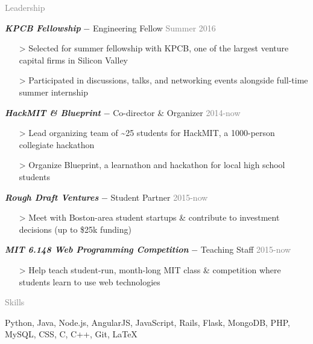 \documentclass[11pt]{article}
\newcommand{\rsection}[1]{\vspace{1.5em}\textcolor{gray}{\Large \robotoslab #1}\vspace{0.5em}}
\newcommand{\bt}[1]{\textit{\textbf{#1}}} %
\newcommand{\gap}[0]{\vspace{0.5em}} %
\newcommand{\dash}[0]{ $-$ } %
\newcommand{\gray}[1]{\textcolor{gray}{#1}}
\newcommand{\e}[0]{> }
\begin{document}
\rsection{Leadership}

\bt{KPCB Fellowship}\dash Engineering Fellow \hfill \gray{Summer 2016}

\begin{itemize}
\item[\e] Selected for summer fellowship with KPCB, one of the largest venture capital firms in Silicon Valley
\item[\e] Participated in discussions, talks, and networking events alongside full-time summer internship
\end{itemize}

\gap

\bt{HackMIT \& Blueprint}\dash Co-director \& Organizer \hfill \gray{2014-now}

\begin{itemize}
\item[\e] Lead organizing team of \textasciitilde 25 students for HackMIT, a 1000-person collegiate hackathon
\item[\e] Organize Blueprint, a learnathon and hackathon for local high school students
\end{itemize}

\gap

\bt{Rough Draft Ventures}\dash Student Partner \hfill \gray{2015-now}

\begin{itemize}
\item[\e] Meet with Boston-area student startups \& contribute to investment decisions (up to \$25k funding)
\end{itemize}

\gap

\bt{MIT 6.148 Web Programming Competition}\dash Teaching Staff \hfill \gray{2015-now}

\begin{itemize}
\item[\e] Help teach student-run, month-long MIT class \& competition where students learn to use web technologies
\end{itemize}

\rsection{Skills}

Python, Java, Node.js, AngularJS, JavaScript, Rails, Flask, MongoDB, PHP, MySQL, CSS, C, C++, Git, {\selectfont\LaTeX}
\end{document}
